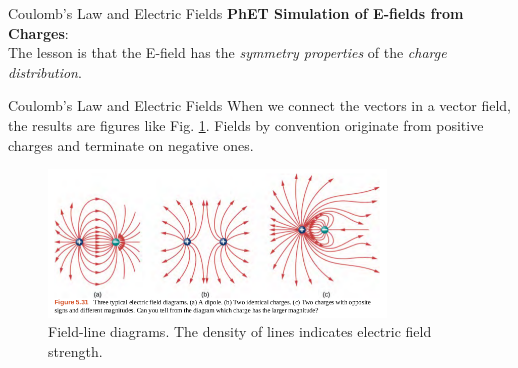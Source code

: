 \documentclass{beamer}
\begin{document}
\begin{frame}{Coulomb’s Law and Electric Fields}
\small
\textbf{PhET Simulation of E-fields from Charges}: \\ \vspace{0.5cm}
\alert{The lesson is that the E-field has the \textit{symmetry properties} of the \textit{charge distribution}}.
\end{frame}

\begin{frame}{Coulomb’s Law and Electric Fields}
When we connect the vectors in a vector field, the results are figures like Fig. \ref{fig:lines}.  Fields by convention originate from positive charges and terminate on negative ones.
\begin{figure}
\includegraphics[width=0.8\textwidth]{figures/lines.png}
\caption{\label{fig:lines} Field-line diagrams.  The density of lines indicates electric field strength.}
\end{figure}
\end{frame}
\end{document}
